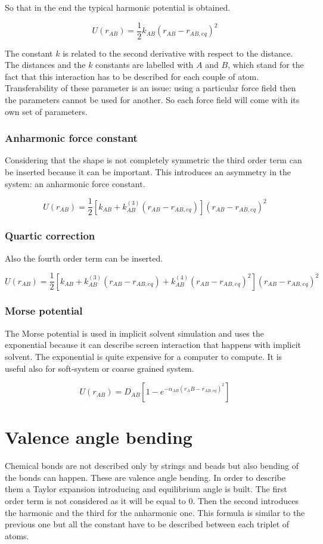 	So that in the end the typical harmonic potential is obtained.

	$$U(r_{AB}) = \frac{1}{2}k_{AB}(r_{AB}-r_{AB,eq})^2$$

	The constant $k$ is related to the second derivative with respect to the distance.
	The distances and the $k$ constants are labelled with $A$ and $B$, which stand for the fact that this interaction has to be described for each couple of atom.
	Transferability of these parameter is an issue: using a particular force field then the parameters cannot be used for another.
	So each force field will come with its own set of parameters.

		\subsubsection{Anharmonic force constant}
		Considering that the shape is not completely symmetric the third order term can be inserted because it can be important.
		This introduces an asymmetry in the system: an anharmonic force constant.

		$$U(r_{AB}) = \frac{1}{2}[k_{AB}+k^{(3)}_{AB}(r_{AB}-r_{AB, eq})](r_{AB}-r_{AB, eq})^2$$

		\subsubsection{Quartic correction}
		Also the fourth order term can be inserted.

		$$U(r_{AB}) = \frac{1}{2}[k_{AB}+k^{(3)}_{AB}(r_{AB}-r_{AB, eq}) + k^{(4)}_{AB}(r_{AB}-r_{AB,eq})^2](r_{AB}-r_{AB, eq})^2$$

		\subsubsection{Morse potential}
		The Morse potential is used in implicit solvent simulation and uses the exponential because it can describe screen interaction that happens with implicit solvent.
		The exponential is quite expensive for a computer to compute.
		It is useful also for soft-system or coarse grained system.

		$$U(r_{AB}) = D_{AB}[1-e^{-\alpha_{AB}(r_AB-r_{AB,eq})^2}]$$

\section{Valence angle bending}
Chemical bonds are not described only by strings and beads but also bending of the bonds can happen.
These are valence angle bending.
In order to describe them a Taylor expansion introducing and equilibrium angle is built.
The first order term is not considered as it will be equal to $0$.
Then the second introduces the harmonic and the third for the anharmonic one.
This formula is similar to the previous one but all the constant have to be described between each triplet of atoms.

